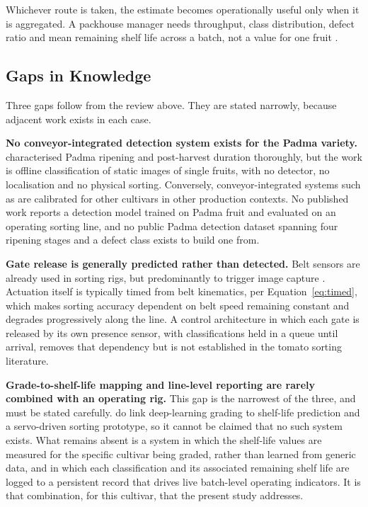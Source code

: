 Whichever route is taken, the estimate becomes operationally useful only when it is aggregated. A packhouse manager needs throughput, class distribution, defect ratio and mean remaining shelf life across a batch, not a value for one fruit \citep{geetha2025}.

\subsection{Gaps in Knowledge}
\label{sec:gaps}

Three gaps follow from the review above. They are stated narrowly, because adjacent work exists in each case.

\textbf{No conveyor-integrated detection system exists for the Padma variety.} \citet{abekoon2024} characterised Padma ripening and post-harvest duration thoroughly, but the work is offline classification of static images of single fruits, with no detector, no localisation and no physical sorting. Conversely, conveyor-integrated systems such as \citet{moya2025} are calibrated for other cultivars in other production contexts. No published work reports a detection model trained on Padma fruit and evaluated on an operating sorting line, and no public Padma detection dataset spanning four ripening stages and a defect class exists to build one from.

\textbf{Gate release is generally predicted rather than detected.} Belt sensors are already used in sorting rigs, but predominantly to trigger image capture \citep{moya2025}. Actuation itself is typically timed from belt kinematics, per Equation~\eqref{eq:timed}, which makes sorting accuracy dependent on belt speed remaining constant and degrades progressively along the line. A control architecture in which each gate is released by its own presence sensor, with classifications held in a queue until arrival, removes that dependency but is not established in the tomato sorting literature.

\textbf{Grade-to-shelf-life mapping and line-level reporting are rarely combined with an operating rig.} This gap is the narrowest of the three, and must be stated carefully. \citet{geetha2025} do link deep-learning grading to shelf-life prediction and a servo-driven sorting prototype, so it cannot be claimed that no such system exists. What remains absent is a system in which the shelf-life values are measured for the specific cultivar being graded, rather than learned from generic data, and in which each classification and its associated remaining shelf life are logged to a persistent record that drives live batch-level operating indicators. It is that combination, for this cultivar, that the present study addresses.

\clearpage
